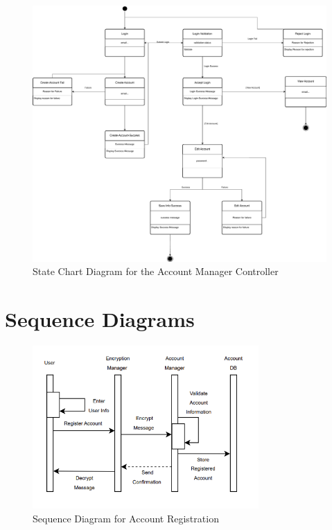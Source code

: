 \documentclass[]{article}
\begin{document}
\begin{figure}[h]
    \centering
    \includegraphics[width=\textwidth]{AccountStateDiagramFinal.pdf}
    \caption{State Chart Diagram for the Account Manager Controller}
\end{figure}


\newpage

\section{Sequence Diagrams}
\label{sec:sequence_diagrams}

\begin{figure}[H]
    \centering
    \includegraphics[width=0.77\textwidth]{RegisterSequenceDiagram.png}
    \caption{Sequence Diagram for Account Registration}
    \label{fig:register}
\end{figure}
\end{document}
